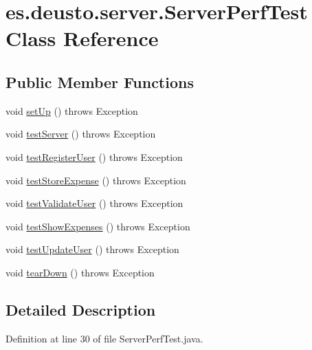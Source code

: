 \hypertarget{classes_1_1deusto_1_1server_1_1_server_perf_test}{}\section{es.\+deusto.\+server.\+Server\+Perf\+Test Class Reference}
\label{classes_1_1deusto_1_1server_1_1_server_perf_test}
\subsection*{Public Member Functions}
\begin{DoxyCompactItemize}
\item 
void \hyperlink{classes_1_1deusto_1_1server_1_1_server_perf_test_a4e78c4f805d8f61c1f23f55dc5b9fe00}{set\+Up} ()  throws Exception 
\item 
void \hyperlink{classes_1_1deusto_1_1server_1_1_server_perf_test_a5c187f8b48709153430bb3e21d392315}{test\+Server} ()  throws Exception 
\item 
void \hyperlink{classes_1_1deusto_1_1server_1_1_server_perf_test_acd84ae388a6b45b90f056d6c051908c6}{test\+Register\+User} ()  throws Exception 
\item 
void \hyperlink{classes_1_1deusto_1_1server_1_1_server_perf_test_a1d4685eb157c172ece9a6ef9ba302696}{test\+Store\+Expense} ()  throws Exception 
\item 
void \hyperlink{classes_1_1deusto_1_1server_1_1_server_perf_test_a9006eeebc72b0f5aa9ee129d11a28b42}{test\+Validate\+User} ()  throws Exception 
\item 
void \hyperlink{classes_1_1deusto_1_1server_1_1_server_perf_test_a823b0fc7575feded84e73dc929a32399}{test\+Show\+Expenses} ()  throws Exception 
\item 
void \hyperlink{classes_1_1deusto_1_1server_1_1_server_perf_test_aeb4e8f76604acdd98213dec2e1f390d6}{test\+Update\+User} ()  throws Exception
\item 
void \hyperlink{classes_1_1deusto_1_1server_1_1_server_perf_test_a81109436602a11e6c7b5221d4b004f9b}{tear\+Down} ()  throws Exception 
\end{DoxyCompactItemize}


\subsection{Detailed Description}


Definition at line 30 of file Server\+Perf\+Test.\+java.



